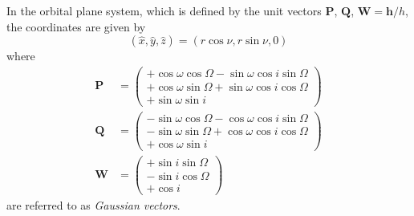 \documentclass[11pt]{article}
\begin{document}
In the orbital plane system, which is defined by the unit vectors
$\boldsymbol{P}$, $\boldsymbol{Q}$, $\boldsymbol{W} = \boldsymbol{h} /
h$, the coordinates are given by
\begin{equation}
  (\hat{x}, \hat{y}, \hat{z}) = (r\cos\nu, r\sin\nu, 0) \label{2.47}\tag{2.47}
\end{equation}
where
\begin{align}
  \boldsymbol{P} &= \left(
    \begin{array}{c}
      + \cos\omega\cos\Omega - \sin\omega\cos i\sin\Omega \\
      + \cos\omega\sin\Omega + \sin\omega\cos i\cos\Omega \\
      + \sin\omega\sin i
    \end{array}\right) \label{2.52}\tag{2.52} \\
  \boldsymbol{Q} &= \left(
    \begin{array}{c}
      - \sin\omega\cos\Omega - \cos\omega\cos i\sin\Omega \\
      - \sin\omega\sin\Omega + \cos\omega\cos i\cos\Omega \\
      + \cos\omega\sin i
    \end{array}\right) \label{2.53}\tag{2.53} \\
  \boldsymbol{W} &= \left(
    \begin{array}{c}
      + \sin i\sin\Omega \\
      - \sin i\cos\Omega \\
      + \cos i
    \end{array}\right) \label{2.54}\tag{2.54}
\end{align}
are referred to as {\em Gaussian vectors}.
\end{document}
